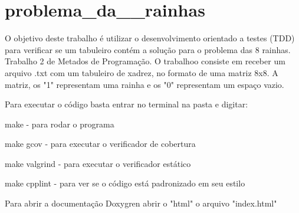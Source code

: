 \chapter{problema\+\_\+da\+\_\+\_\+rainhas}
\hypertarget{md_README}{}\label{md_README}
\label{md_README_autotoc_md0}%
%
O objetivo deste trabalho é utilizar o desenvolvimento orientado a testes (TDD) para verificar se um tabuleiro contém a solução para o problema das 8 rainhas. Trabalho 2 de Metados de Programação. O trabalhoo consiste em receber um arquivo .txt com um tabuleiro de xadrez, no formato de uma matriz 8x8. A matriz, os "{}1"{} representam uma rainha e os "{}0"{} representam um espaço vazio.

Para executar o código basta entrar no terminal na pasta e digitar\+:
\begin{DoxyEnumerate}
\item make -\/ para rodar o programa
\item make gcov -\/ para executar o verificador de cobertura
\item make valgrind -\/ para executar o verificador estático
\item make cpplint -\/ para ver se o código está padronizado em seu estilo
\end{DoxyEnumerate}

Para abrir a documentação Doxygren abrir o "{}html"{} o arquivo "{}index.\+html"{} 
